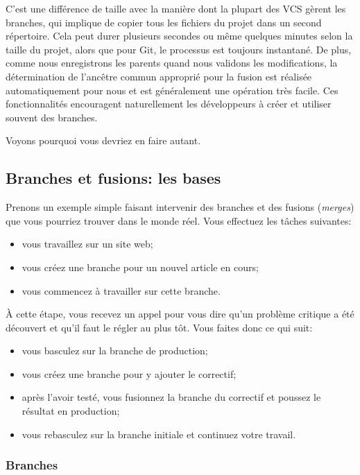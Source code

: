 C'est une différence de taille avec la manière dont la plupart des VCS gèrent les branches, qui implique de copier tous les fichiers du projet dans un second répertoire.
Cela peut durer plusieurs secondes ou même quelques minutes selon la taille du projet, alors que pour Git, le processus est toujours instantané.
De plus, comme nous enregistrons les parents quand nous validons les modifications, la détermination de l'ancêtre commun approprié pour la fusion est réalisée automatiquement pour nous et est généralement une opération très facile.
Ces fonctionnalités encouragent naturellement les développeurs à créer et utiliser souvent des branches.

Voyons pourquoi vous devriez en faire autant.

\subsection{Branches et fusions: les bases}

Prenons un exemple simple faisant intervenir des branches et des fusions (\emph{merges}) que vous pourriez trouver dans le monde réel.
Vous effectuez les tâches suivantes:

\begin{itemize}
\item vous travaillez sur un site web;
\item vous créez une branche pour un nouvel article en cours;
\item vous commencez à travailler sur cette branche.
\end{itemize}

À cette étape, vous recevez un appel pour vous dire qu'un problème critique a été découvert et qu'il faut le régler au plus tôt.
Vous faites donc ce qui suit:

\begin{itemize}
\item vous basculez sur la branche de production;
\item vous créez une branche pour y ajouter le correctif;
\item après l'avoir testé, vous fusionnez la branche du correctif et poussez le résultat en production;
\item vous rebasculez sur la branche initiale et continuez votre travail.
\end{itemize}

\subsubsection{Branches}
\label{sec:git:basic_branching}

